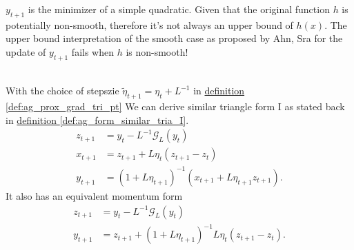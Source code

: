 \documentclass[12pt]{article}
\begin{document}
            \begin{remark}
                $y_{t + 1}$ is the minimizer of a simple quadratic. 
                Given that the original function $h$ is potentially non-smooth, therefore it's not always an upper bound of $h(x)$. 
                The upper bound interpretation of the smooth case as proposed by Ahn, Sra for the update of $y_{t + 1}$ fails when $h$ is non-smooth! 
            \end{remark}

            \begin{lemma}
                \quad \\
                With the choice of stepszie $\tilde \eta_{t + 1} = \eta_t + L^{-1}$ 
                in 
                \hyperref[def:ag_prox_grad_tri_pt]{definition \ref*{def:ag_prox_grad_tri_pt}}
                We can derive similar triangle form I as stated back in
                \hyperref[def:ag_form_similar_tria_I]{definition \ref*{def:ag_form_similar_tria_I}}. 
                \begin{align*}
                    z_{t + 1} &= y_t - L^{-1} \mathcal G_L(y_t)
                    \\
                    x_{t + 1} &= z_{t + 1} + L\eta_t (z_{t + 1} - z_t)
                    \\
                    y_{t + 1} &= 
                    (1 + L\eta_{t + 1})^{-1}
                    (
                    x_{t + 1} + L\eta_{t + 1}z_{t + 1}
                    ). 
                \end{align*}
                It also has an equivalent momentum form 
                \begin{align*}
                    z_{t + 1} &= y_t - L^{-1}\mathcal G_L(y_t)
                    \\
                    y_{t + 1} &= z_{t + 1} + (1 + L\eta_{t + 1})^{-1}L\eta_t (z_{t + 1} - z_t). 
                \end{align*}
            \end{lemma}
\end{document}
